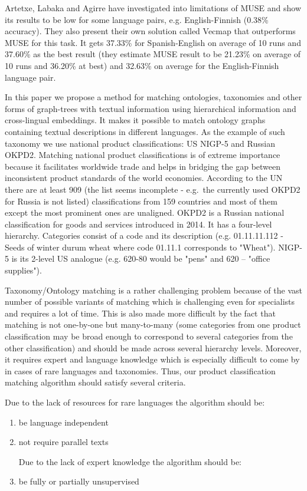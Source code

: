 \documentclass[11pt,a4paper]{article}
\begin{document}
Artetxe, Labaka and Agirre have investigated into limitations of MUSE and show its results to be low for some language pairs, e.g. English-Finnish (0.38\% accuracy). They also present their own solution called Vecmap \cite{vecmap} that outperforms MUSE for this task. It gets 37.33\% for Spanish-English on average of 10 runs and 37.60\% as the best result (they estimate MUSE result to be 21.23\% on average of 10 runs and 36.20\% at best) and 32.63\% on average for the English-Finnish language pair.

In this paper we propose a method for matching ontologies, taxonomies and other forms of graph-trees with textual information using hierarchical information and cross-lingual embeddings. It makes it possible to match ontology graphs containing textual descriptions in different languages. As the example of such taxonomy we use national product classifications: US NIGP-5 and Russian OKPD2. Matching national product classifications is of extreme importance because it facilitates worldwide trade and helps in bridging the gap between inconsistent product standards of the world economies. According to the UN \cite{unsd} there are at least 909 (the list seems incomplete - e.g.\ the currently used OKPD2 for Russia is not listed) classifications from 159 countries and most of them except the most prominent ones are unaligned. OKPD2 is a Russian national classification for goods and services introduced in 2014. It has a four-level hierarchy. Categories consist of a code and its description (e.g. 01.11.11.112 - Seeds of winter durum wheat where code 01.11.1 corresponds to "Wheat"). NIGP-5 is its 2-level US analogue (e.g. 620-80 would be "pens" and 620 -- "office supplies").

Taxonomy/Ontology matching is a rather challenging problem because of the vast number of possible variants of matching which is challenging even for specialists and requires a lot of time. This is also made more difficult by the fact that matching is not one-by-one but many-to-many (some categories from one product classification may be broad enough to correspond to several categories from the other classification) and should be made across several hierarchy levels. Moreover, it requires expert and language knowledge which is especially difficult to come by in cases of rare languages and taxonomies. Thus, our product classification matching algorithm should satisfy several criteria.

Due to the lack of resources for rare languages	the algorithm should be:
\begin{enumerate}

	\item be language independent

	\item not require parallel texts


	Due to the lack of expert knowledge the algorithm should be:

	\item be fully or partially unsupervised
\end{enumerate}
\end{document}
